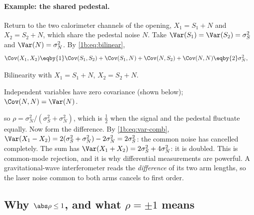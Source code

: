 \paragraph{Example: the shared pedestal.}
Return to the two calorimeter channels of the opening, $X_1=S_1+N$ and
$X_2=S_2+N$, which share the pedestal noise $N$. Take $\Var(S_1)=\Var(S_2)=\sigma_S^2$ and
$\Var(N)=\sigma_N^2$. By \eqref{1b:eq:bilinear},
\begin{align*}
  \Cov(X_1,X_2)
  &\eqby{1} \Cov(S_1,S_2)+\Cov(S_1,N)+\Cov(N,S_2)+\Cov(N,N)
   \eqby{2} \sigma_N^2 ,
\end{align*}
\begin{explain}
  \item Bilinearity with $X_1=S_1+N$, $X_2=S_2+N$.
  \item Independent variables have zero covariance (shown below); $\Cov(N,N)=\Var(N)$.
\end{explain}
so $\rho=\sigma_N^2/(\sigma_S^2+\sigma_N^2)$, which is $\tfrac12$ when the
signal and the pedestal fluctuate equally. Now form the difference. By
\eqref{1b:eq:var-comb},
$\Var(X_1-X_2)=2(\sigma_S^2+\sigma_N^2)-2\sigma_N^2=2\sigma_S^2$: the common
noise has cancelled completely. The sum has $\Var(X_1+X_2)=2\sigma_S^2+4\sigma_N^2$:
it is doubled. This is common-mode rejection, and it is why differential
measurements are powerful. A gravitational-wave interferometer reads the
\emph{difference} of its two arm lengths, so the laser noise common to both
arms cancels to first order.

\subsection{Why \texorpdfstring{$\abs\rho\le1$}{|rho| <= 1}, and what \texorpdfstring{$\rho=\pm1$}{rho = +-1} means}

